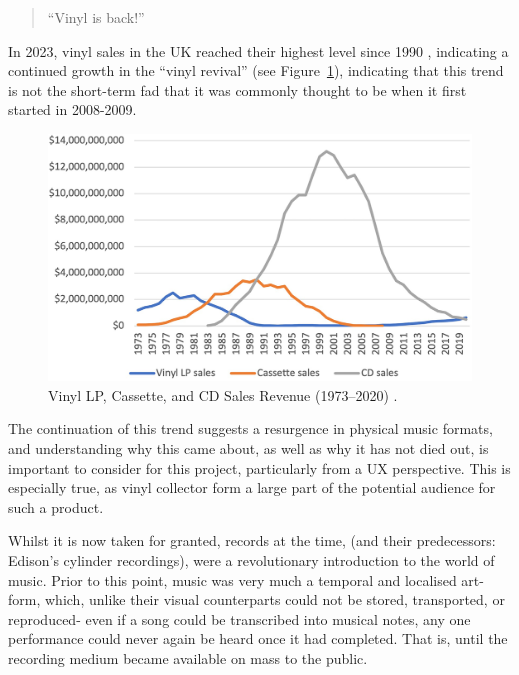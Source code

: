             \begin{quote}
                ``Vinyl is back!'' \cite{bechhofervttspec}
            \end{quote}
            
            In 2023, vinyl sales in the UK reached their highest level since 1990 \cite{geraghty2023uk_vinyl_sales}, indicating a continued growth in the ``vinyl revival'' \cite{vinylRevival} (see Figure~\ref{fig:vinyl_sales}), indicating that this trend is not the short-term fad that it was commonly thought to be when it first started in 2008-2009.
            
            \begin{figure}[htbp]
                \centering
                \includegraphics[width=\linewidth]{images/vinyl_sales_2023.png}
                \caption{Vinyl LP, Cassette, and CD Sales Revenue (1973–2020) \cite{vinylRevival}.}
                \label{fig:vinyl_sales}
            \end{figure}
    
            The continuation of this trend suggests a resurgence in physical music formats, and understanding why this came about, as well as why it has not died out, is important to consider for this project, particularly from a UX perspective. This is especially true, as vinyl collector form a large part of the potential audience for such a product.
    
            Whilst it is now taken for granted, records at the time, (and their predecessors: Edison's cylinder recordings), were a revolutionary introduction to the world of music. Prior to this point, music was very much a temporal and localised art-form, which, unlike their visual counterparts could not be stored, transported, or reproduced- even if a song could be transcribed into musical notes, any one performance could never again be heard once it had completed. That is, until the recording medium became available on mass to the public.
    
